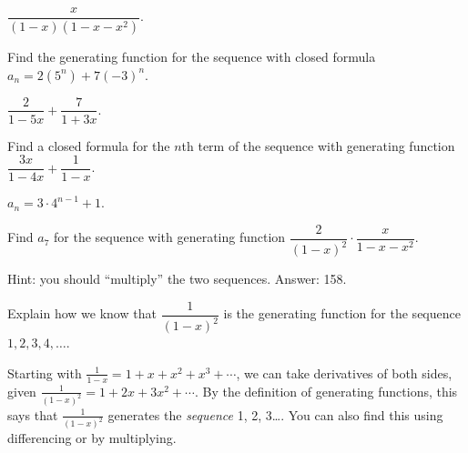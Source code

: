 \begin{questions}
	\begin{answer}
		$\dfrac{x}{(1-x)(1-x-x^2)}$.  %
	\end{answer}
	
	
	
	


\question Find the generating function for the sequence with closed formula $a_n = 2(5^n) + 7(-3)^n$.

	\begin{answer}
		$\dfrac{2}{1-5x} + \dfrac{7}{1+3x}$.  %
	\end{answer}
	
	
	
	


\question Find a closed formula for the $n$th term of the sequence with generating function $\dfrac{3x}{1-4x} + \dfrac{1}{1-x}$.

	\begin{answer}
		$a_n = 3\cdot 4^{n-1} + 1$.  %
	\end{answer}
	
	
	
	


\question Find $a_7$ for the sequence with generating function $\dfrac{2}{(1-x)^2}\cdot\dfrac{x}{1-x-x^2}$.

	\begin{answer}
		Hint: you should ``multiply'' the two sequences.  Answer: 158.  %
	\end{answer}
	




\question Explain how we know that $\dfrac{1}{(1-x)^2}$ is the generating function for the sequence $1, 2, 3, 4, \ldots$.

	\begin{answer}
		Starting with $\frac{1}{1-x} = 1 + x + x^2 + x^3 +\cdots$, we can take derivatives of both sides, given $\frac{1}{(1-x)^2} = 1 + 2x + 3x^2 + \cdots$.  By the definition of generating functions, this says that $\frac{1}{(1-x)^2}$ generates the {\em sequence} 1, 2, 3\ldots.  You can also find this using differencing or by multiplying. 
	\end{answer}






\end{questions}
